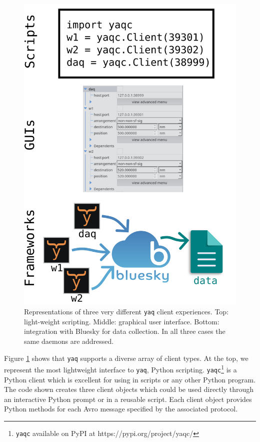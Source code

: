 \documentclass[aip, amsmath, amssymb, reprint,]{revtex4-2}
\newcommand\yaq{\texttt{yaq}}
\begin{document}
\begin{figure}
  \includegraphics[width=\columnwidth]{figures/client_spectrum}
  \caption{\label{fig:foundation} Representations of three very different \yaq{} client experiences. Top: light-weight scripting. Middle: graphical user interface. Bottom: integration with Bluesky for data collection. In all three cases the same daemons are addressed.}
\end{figure}

Figure \ref{fig:foundation} shows that \yaq{} supports a diverse array of client types.
At the top, we represent the most lightweight interface to \yaq{}, Python scripting.
\texttt{yaqc}\footnote{\texttt{yaqc} available on PyPI at https://pypi.org/project/yaqc/} is a Python client which is excellent for using in scripts or any other Python program.
The code shown creates three client objects which could be used directly through an interactive Python prompt or in a reusable script.
Each client object provides Python methods for each Avro message specified by the associated protocol.
\end{document}
